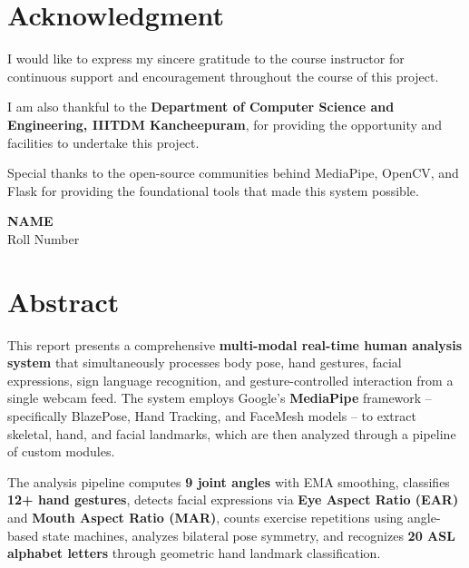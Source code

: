 \documentclass[a4paper,12pt]{report}
\begin{document}
\vspace{2cm}
\begingroup
\let\clearpage\relax

\chapter*{Acknowledgment}
\thispagestyle{contentpages}
I would like to express my sincere gratitude to the course instructor for continuous support and encouragement throughout the course of this project.

I am also thankful to the \textbf{Department of Computer Science and Engineering, IIITDM Kancheepuram}, for providing the opportunity and facilities to undertake this project.

Special thanks to the open-source communities behind MediaPipe, OpenCV, and Flask for providing the foundational tools that made this system possible.

\vspace{1cm}
\begin{flushright}
\textbf{NAME}\\
Roll Number
\end{flushright}

\endgroup
\newpage

\chapter*{Abstract}
\thispagestyle{contentpages}
\justifying
\noindent
This report presents a comprehensive \textbf{multi-modal real-time human analysis system} that simultaneously processes body pose, hand gestures, facial expressions, sign language recognition, and gesture-controlled interaction from a single webcam feed. The system employs Google's \textbf{MediaPipe} framework -- specifically BlazePose, Hand Tracking, and FaceMesh models -- to extract skeletal, hand, and facial landmarks, which are then analyzed through a pipeline of custom modules.

\par
The analysis pipeline computes \textbf{9 joint angles} with EMA smoothing, classifies \textbf{12+ hand gestures}, detects facial expressions via \textbf{Eye Aspect Ratio (EAR)} and \textbf{Mouth Aspect Ratio (MAR)}, counts exercise repetitions using angle-based state machines, analyzes bilateral pose symmetry, and recognizes \textbf{20 ASL alphabet letters} through geometric hand landmark classification.
\end{document}
